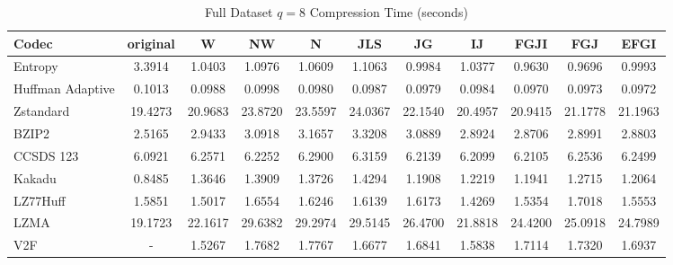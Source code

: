 \documentclass{article}
\begin{document}
\begin{table}[h!]
\centering
\caption{Full Dataset $q=8$ Compression Time (seconds)}
\begin{tabular}{|l|cccccccccc|}
\hline
Codec &  original &       W &      NW &       N &     JLS &      JG &      IJ &    FGJI &     FGJ &    EFGI \\
\hline
Entropy & 3.3914 & 1.0403 & 1.0976 & 1.0609 & 1.1063 & 0.9984 & 1.0377 & 0.9630 & 0.9696 & 0.9993         \\
\hline
Huffman Adaptive &    0.1013 &  0.0988 &  0.0998 &  0.0980 &  0.0987 &  0.0979 &  0.0984 &  0.0970 &  0.0973 &  0.0972 \\
Zstandard        &   19.4273 & 20.9683 & 23.8720 & 23.5597 & 24.0367 & 22.1540 & 20.4957 & 20.9415 & 21.1778 & 21.1963 \\
BZIP2            &    2.5165 &  2.9433 &  3.0918 &  3.1657 &  3.3208 &  3.0889 &  2.8924 &  2.8706 &  2.8991 &  2.8803 \\
CCSDS 123        &    6.0921 &  6.2571 &  6.2252 &  6.2900 &  6.3159 &  6.2139 &  6.2099 &  6.2105 &  6.2536 &  6.2499 \\
Kakadu           &    0.8485 &  1.3646 &  1.3909 &  1.3726 &  1.4294 &  1.1908 &  1.2219 &  1.1941 &  1.2715 &  1.2064 \\
LZ77Huff         &    1.5851 &  1.5017 &  1.6554 &  1.6246 &  1.6139 &  1.6173 &  1.4269 &  1.5354 &  1.7018 &  1.5553 \\
LZMA             &   19.1723 & 22.1617 & 29.6382 & 29.2974 & 29.5145 & 26.4700 & 21.8818 & 24.4200 & 25.0918 & 24.7989 \\
V2F              &    - &  1.5267 &  1.7682 &  1.7767 &  1.6677 &  1.6841 &  1.5838 &  1.7114 &  1.7320 &  1.6937 \\
\hline
\end{tabular}
\end{table}
\end{document}
